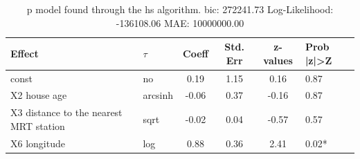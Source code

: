\begin{table}
	\caption{p model found through the hs algorithm. bic: 272241.73 Log-Likelihood: -136108.06 MAE: 10000000.00}
	\begin{center}
		\begin{tabular}{|l|l|c|c|c|l|}
			\hline
			Effect & $\tau$ & Coeff & Std. Err & z-values & Prob |z|>Z \\
			\hline
			const & no & 0.19 & 1.15 & 0.16 & 0.87 \\
			\hline
			X2 house age & arcsinh & -0.06 & 0.37 & -0.16 & 0.87 \\
			\hline
			X3 distance to the nearest MRT station & sqrt & -0.02 & 0.04 & -0.57 & 0.57 \\
			\hline
			X6 longitude & log & 0.88 & 0.36 & 2.41 & 0.02* \\
			\hline
		\end{tabular}
	\end{center}
\end{table}